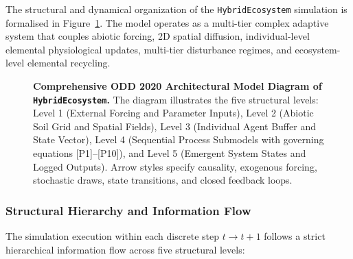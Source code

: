 \documentclass[11pt,a4paper]{article}
\begin{document}
The structural and dynamical organization of the \texttt{HybridEcosystem} simulation is formalised in Figure~\ref{fig:model_architecture}. The model operates as a multi-tier complex adaptive system that couples abiotic forcing, 2D spatial diffusion, individual-level elemental physiological updates, multi-tier disturbance regimes, and ecosystem-level elemental recycling.

\begin{figure}[H]
\centering
\caption{\textbf{Comprehensive ODD 2020 Architectural Model Diagram of \texttt{HybridEcosystem}.} The diagram illustrates the five structural levels: Level 1 (External Forcing and Parameter Inputs), Level 2 (Abiotic Soil Grid and Spatial Fields), Level 3 (Individual Agent Buffer and State Vector), Level 4 (Sequential Process Submodels with governing equations [P1]--[P10]), and Level 5 (Emergent System States and Logged Outputs). Arrow styles specify causality, exogenous forcing, stochastic draws, state transitions, and closed feedback loops.}
\label{fig:model_architecture}
\end{figure}

\subsubsection{Structural Hierarchy and Information Flow}
The simulation execution within each discrete step $t \to t+1$ follows a strict hierarchical information flow across five structural levels:
\end{document}
